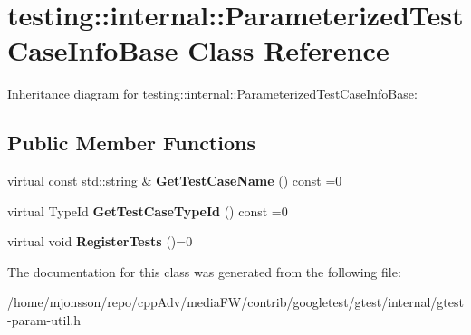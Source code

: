 \hypertarget{classtesting_1_1internal_1_1ParameterizedTestCaseInfoBase}{}\section{testing\+:\+:internal\+:\+:Parameterized\+Test\+Case\+Info\+Base Class Reference}
\label{classtesting_1_1internal_1_1ParameterizedTestCaseInfoBase}


Inheritance diagram for testing\+:\+:internal\+:\+:Parameterized\+Test\+Case\+Info\+Base\+:
\subsection*{Public Member Functions}
\begin{DoxyCompactItemize}
\item 
\mbox{\label{classtesting_1_1internal_1_1ParameterizedTestCaseInfoBase_ac69b3bc29debfd6d891b7f5b2d088b1c}} 
virtual const std\+::string \& {\bfseries Get\+Test\+Case\+Name} () const =0
\item 
\mbox{\label{classtesting_1_1internal_1_1ParameterizedTestCaseInfoBase_a932b4a9185a72d5bdfa5fd84fc06cbca}} 
virtual Type\+Id {\bfseries Get\+Test\+Case\+Type\+Id} () const =0
\item 
\mbox{\label{classtesting_1_1internal_1_1ParameterizedTestCaseInfoBase_a92baca6c64c822c2e7043217f7903ef2}} 
virtual void {\bfseries Register\+Tests} ()=0
\end{DoxyCompactItemize}


The documentation for this class was generated from the following file\+:\begin{DoxyCompactItemize}
\item 
/home/mjonsson/repo/cpp\+Adv/media\+F\+W/contrib/googletest/gtest/internal/gtest-\/param-\/util.\+h\end{DoxyCompactItemize}
